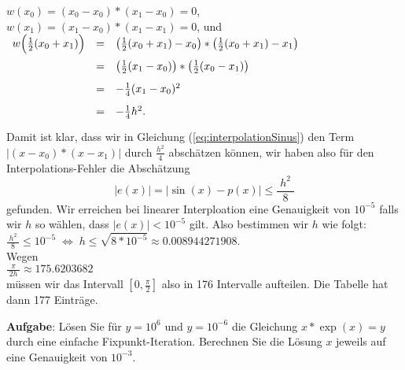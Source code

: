 \documentclass{article}
\newcommand{\bruch}[2]{\displaystyle\frac{\;\displaystyle#1\;}{\;\displaystyle#2\;}}
\begin{document}
\hspace*{1.3cm}
$w(x_0) = (x_0 - x_0)*(x_1-x_0) = 0$, 
\\[0.1cm]
\hspace*{1.3cm}
$w(x_1) = (x_1 - x_0)*(x_1-x_1) = 0$, \quad und 
\\[0.1cm]
\hspace*{1.15cm}
$
\begin{array}[t]{lcl}
w\Bigl(\frac{1}{2}(x_0 + x_1)\Bigr) & = & \left(\frac{1}{2}(x_0 + x_1) - x_0\right)*\left(\frac{1}{2}(x_0 + x_1)-x_1\right) \\[0.3cm]
                                    & = & \left(\frac{1}{2}(x_1 - x_0)\right)*\left(\frac{1}{2}(x_0 - x_1)\right) \\[0.3cm]
                                    & = & - \frac{1}{4} (x_1 - x_0)^2 \\[0.3cm]
                                    & = & - \frac{1}{4} h^2. \\[0.3cm]
\end{array}\\[0.1cm]
$
\\[0.3cm]
Damit ist klar, dass wir in Gleichung (\ref{eq:interpolationSinus}) den Term
$\bigl|(x-x_0)*(x-x_1)\bigr|$ durch $\frac{h^2}{4}$ absch\"atzen k\"onnen, wir haben also f\"ur
den Interpolations-Fehler die Absch\"atzung 
\begin{equation}
  \label{eq:interpolationSinus2}
  |e(x)| = \bigl|\sin(x) -p(x)\bigr| \leq \bruch{h^2}{8}
\end{equation}
gefunden.   Wir erreichen bei linearer Interploation eine Genauigkeit von
$10^{-5}$ falls wir $h$ so w\"ahlen, dass $|e(x)| < 10^{-5}$ gilt.  Also bestimmen wir $h$
wie folgt: 
\\[0.1cm]
\hspace*{1.3cm}
$\bruch{h^2}{8} \leq 10^{-5} \;\Leftrightarrow\; h \leq \sqrt{8 * 10^{-5}} \approx 0.008944271908$.
\\[0.1cm]
Wegen \\[0.1cm]
\hspace*{1.3cm}
$\bruch{\pi}{2h} \approx 175.6203682$
\\[0.1cm] 
m\"ussen wir das Intervall $[0,\frac{\pi}{2}]$ also in 176 Intervalle aufteilen.
Die Tabelle hat dann 177 Eintr\"age.
\pagebreak

\noindent
\textbf{Aufgabe}: L\"osen Sie f\"ur $y=10^6$ und $y=10^{-6}$ die Gleichung $x*\exp(x) = y$ 
durch eine einfache Fixpunkt-Iteration.  Berechnen Sie die L\"osung $x$ jeweils auf eine
Genauigkeit von $10^{-3}$.
\vspace*{0.3cm}
\end{document}
